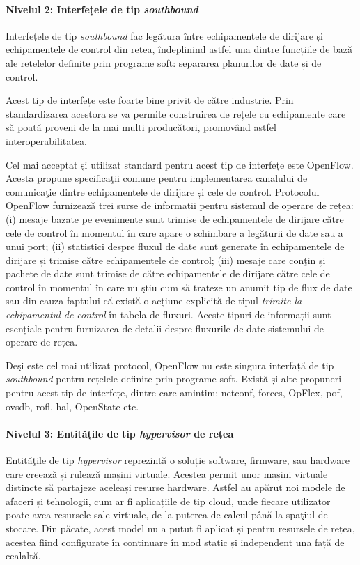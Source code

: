 \paragraph{Nivelul 2: Interfețele de tip \textit{southbound}}

Interfețele de tip \textit{southbound} fac legătura între echipamentele de dirijare și echipamentele de control din rețea, îndeplinind astfel una dintre funcțiile de bază ale rețelelor definite prin programe soft: separarea planurilor de date și de control.

Acest tip de interfețe este foarte bine privit de către industrie. Prin standardizarea acestora se va permite construirea de rețele cu echipamente care să poată proveni de la mai multi producători, promovând astfel interoperabilitatea.

Cel mai acceptat și utilizat standard pentru acest tip de interfețe este OpenFlow. Acesta propune specificaţii comune pentru implementarea canalului de comunicaţie dintre echipamentele de dirijare și cele de control. Protocolul OpenFlow furnizează trei surse de informații pentru sistemul de operare de rețea: (i) mesaje bazate pe evenimente sunt trimise de echipamentele de dirijare către cele de control în momentul în care apare o schimbare a legăturii de date sau a unui port; (ii) statistici despre fluxul de date sunt generate în echipamentele de dirijare și trimise către echipamentele de control; (iii) mesaje care conţin și pachete de date sunt trimise de către echipamentele de dirijare către cele de control în momentul în care nu ştiu cum să trateze un anumit tip de flux de date sau din cauza faptului că există o acțiune explicită de tipul \textit{trimite la echipamentul de control} în tabela de fluxuri. Aceste tipuri de informații sunt esențiale pentru furnizarea de detalii despre fluxurile de date sistemului de operare de rețea.

Deşi este cel mai utilizat protocol, OpenFlow nu este singura interfață de tip \textit{southbound} pentru rețelele definite prin programe soft. Există și alte propuneri pentru acest tip de interfețe, dintre care amintim: \gls{netconf}, \gls{forces}, OpFlex, \gls{pof}, \gls{ovsdb}, \gls{rofl}, \gls{hal}, OpenState etc.

\paragraph{Nivelul 3: Entitățile de tip \textit{hypervisor} de rețea}

Entităţile de tip \textit{hypervisor} reprezintă o soluție software, firmware, sau hardware care creează și rulează mașini virtuale. Acestea permit unor mașini virtuale distincte să partajeze aceleași resurse hardware. Astfel au apărut noi modele de afaceri și tehnologii, cum ar fi aplicațiile de tip cloud, unde fiecare utilizator poate avea resursele sale virtuale, de la puterea de calcul până la spaţiul de stocare. Din păcate, acest model nu a putut fi aplicat și pentru resursele de rețea, acestea fiind configurate în continuare în mod static și independent una față de cealaltă.

